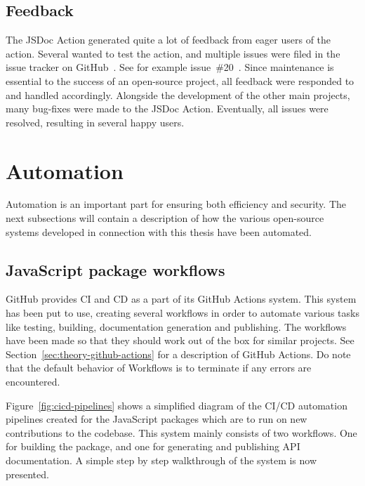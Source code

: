 \subsection{Feedback}
The JSDoc Action generated quite a lot of feedback from eager users of the action. Several wanted to test the action, and multiple issues were filed in the issue tracker on GitHub~\cite{jsdoc-action-issue-tracker}. See for example issue~\#20~\cite{jsdoc-issue-20}. Since maintenance is essential to the success of an open-source project, all feedback were responded to and handled accordingly. Alongside the development of the other main projects, many bug-fixes were made to the JSDoc Action. Eventually, all issues were resolved, resulting in several happy users.


\section{Automation}
Automation is an important part for ensuring both efficiency and security. The next subsections will contain a description of how the various open-source systems developed in connection with this thesis have been automated.

\subsection{JavaScript package workflows}
\label{sec:method-javascript-package-workflows}
GitHub provides CI and CD as a part of its GitHub Actions system. This system has been put to use, creating several workflows in order to automate various tasks like testing, building, documentation generation and publishing. The workflows have been made so that they should work out of the box for similar projects. See Section~\ref{sec:theory-github-actions} for a description of GitHub Actions. Do note that the default behavior of Workflows is to terminate if any errors are encountered.

Figure~\ref{fig:cicd-pipelines} shows a simplified diagram of the CI/CD automation pipelines created for the JavaScript packages which are to run on new contributions to the codebase. This system mainly consists of two workflows. One for building the package, and one for generating and publishing API documentation. A simple step by step walkthrough of the system is now presented.

